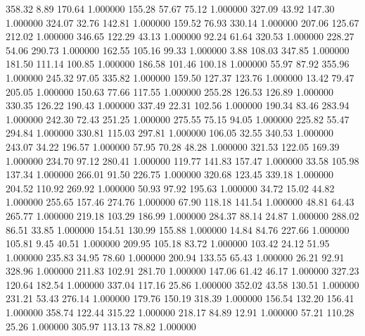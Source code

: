     358.32      8.89    170.64  1.000000
    155.28     57.67     75.12  1.000000
    327.09     43.92    147.30  1.000000
    324.07     32.76    142.81  1.000000
    159.52     76.93    330.14  1.000000
    207.06    125.67    212.02  1.000000
    346.65    122.29     43.13  1.000000
     92.24     61.64    320.53  1.000000
    228.27     54.06    290.73  1.000000
    162.55    105.16     99.33  1.000000
      3.88    108.03    347.85  1.000000
    181.50    111.14    100.85  1.000000
    186.58    101.46    100.18  1.000000
     55.97     87.92    355.96  1.000000
    245.32     97.05    335.82  1.000000
    159.50    127.37    123.76  1.000000
     13.42     79.47    205.05  1.000000
    150.63     77.66    117.55  1.000000
    255.28    126.53    126.89  1.000000
    330.35    126.22    190.43  1.000000
    337.49     22.31    102.56  1.000000
    190.34     83.46    283.94  1.000000
    242.30     72.43    251.25  1.000000
    275.55     75.15     94.05  1.000000
    225.82     55.47    294.84  1.000000
    330.81    115.03    297.81  1.000000
    106.05     32.55    340.53  1.000000
    243.07     34.22    196.57  1.000000
     57.95     70.28     48.28  1.000000
    321.53    122.05    169.39  1.000000
    234.70     97.12    280.41  1.000000
    119.77    141.83    157.47  1.000000
     33.58    105.98    137.34  1.000000
    266.01     91.50    226.75  1.000000
    320.68    123.45    339.18  1.000000
    204.52    110.92    269.92  1.000000
     50.93     97.92    195.63  1.000000
     34.72     15.02     44.82  1.000000
    255.65    157.46    274.76  1.000000
     67.90    118.18    141.54  1.000000
     48.81     64.43    265.77  1.000000
    219.18    103.29    186.99  1.000000
    284.37     88.14     24.87  1.000000
    288.02     86.51     33.85  1.000000
    154.51    130.99    155.88  1.000000
     14.84     84.76    227.66  1.000000
    105.81      9.45     40.51  1.000000
    209.95    105.18     83.72  1.000000
    103.42     24.12     51.95  1.000000
    235.83     34.95     78.60  1.000000
    200.94    133.55     65.43  1.000000
     26.21     92.91    328.96  1.000000
    211.83    102.91    281.70  1.000000
    147.06     61.42     46.17  1.000000
    327.23    120.64    182.54  1.000000
    337.04    117.16     25.86  1.000000
    352.02     43.58    130.51  1.000000
    231.21     53.43    276.14  1.000000
    179.76    150.19    318.39  1.000000
    156.54    132.20    156.41  1.000000
    358.74    122.44    315.22  1.000000
    218.17     84.89     12.91  1.000000
     57.21    110.28     25.26  1.000000
    305.97    113.13     78.82  1.000000
